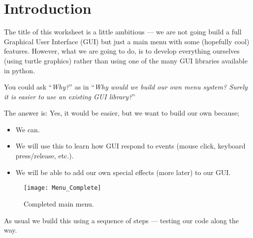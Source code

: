 \documentclass{coderdojo}
\begin{document}
\maketitle


\section*{Introduction}

The title of this worksheet is a little ambitious --- we are not going build a full Graphical User Interface (GUI) but just a main menu with some (hopefully cool) features.  However, what we are going to do, is to develop everything ourselves (using turtle graphics) rather than using one of the many GUI libraries available in python. 

\vspace{6pt}
You could ask ``{\em Why?}'' as in ``{\em Why would we build our own menu system? Surely it is easier to use an existing GUI library?}''

\begin{minipage}{.5\textwidth}
The answer is: Yes, it would be easier, but we want to build our own because;

\begin{itemize}
\item We can.
\item We will use this to learn how GUI respond to events (mouse click, keyboard press/release, etc.).
\item We will be able to add our own special effects (more later) to our GUI.
\end{itemize}
\end{minipage}
\begin{minipage}{.5\textwidth}
\begin{figure}[H]
\centering
\texttt{[image: Menu\_Complete]}\\[-12pt]
\caption{Completed main menu.} 
\end{figure}
\end{minipage}

\vspace{6pt}
As usual we build this using a sequence of steps --- testing our code along the way.
\end{document}
